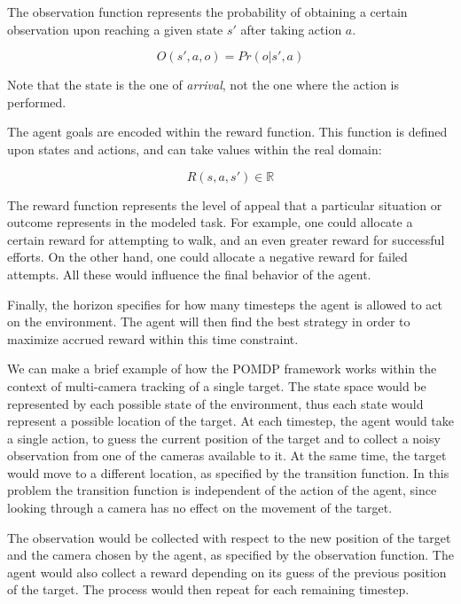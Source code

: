 The observation function represents the probability of obtaining a certain observation upon reaching
a given state $s'$ after taking action $a$.

\begin{equation}
 O(s', a, o) = Pr(o | s', a)
\end{equation}

Note that the state is the one of \textit{arrival}, not the one where the action is performed.

The agent goals are encoded within the reward function. This function is defined upon states and
actions, and can take values within the real domain:

\begin{equation}
 R(s, a, s') \in \mathbb{R}
\end{equation}

The reward function represents the level of appeal that a particular situation or outcome represents
in the modeled task. For example, one could allocate a certain reward for attempting to walk, and an
even greater reward for successful efforts. On the other hand, one could allocate a negative reward
for failed attempts. All these would influence the final behavior of the agent.

Finally, the horizon specifies for how many timesteps the agent is allowed to act on the
environment. The agent will then find the best strategy in order to maximize accrued reward within
this time constraint.

We can make a brief example of how the POMDP framework works within the context of multi-camera
tracking of a single target. The state space would be represented by each possible state of the
environment, thus each state would represent a possible location of the target. At each timestep,
the agent would take a single action, to guess the current position of the target and to collect a
noisy observation from one of the cameras available to it. At the same time, the target would move
to a different location, as specified by the transition function. In this problem the transition
function is independent of the action of the agent, since looking through a camera has no effect on
the movement of the target.

The observation would be collected with respect to the new position of the target and the camera
chosen by the agent, as specified by the observation function. The agent would also collect a reward
depending on its guess of the previous position of the target. The process would then repeat for
each remaining timestep.

